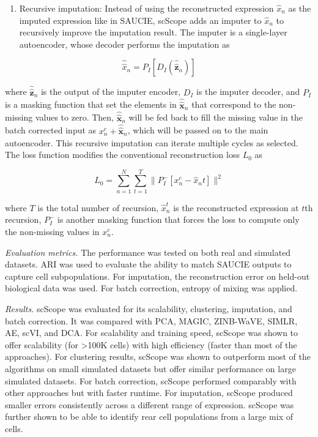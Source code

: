 \documentclass[
]{book}
\providecommand{\tightlist}{%
  \setlength{\itemsep}{0pt}\setlength{\parskip}{0pt}}
\begin{document}
\begin{enumerate}
\def\labelenumi{\arabic{enumi}.}
\setcounter{enumi}{1}
\tightlist
\item
  Recursive imputation: Instead of using the reconstructed expression \(\hat{x}_{n}\) as the imputed expression like in SAUCIE, scScope adds an imputer to \(\hat{x}_{n}\) to recursively improve the imputation result. The imputer is a single-layer autoencoder, whose decoder performs the imputation as
\end{enumerate}

\begin{equation}
\widehat{\widehat{x}}_{n} = P_{I}[D_{I}(\widehat{\widehat{\mathbf{z}}}_{n})] \label{eq:eq41}
\end{equation}

where \(\widehat{\widehat{\mathbf{z}}}_{n}\) is the output of the imputer encoder, \(D_{I}\) is the imputer decoder, and \(P_{I}\) is a masking function that set the elements in \(\widehat{\widehat{\mathbf{x}}}_{n}\) that correspond to the non-missing values to zero. Then, \(\widehat{\widehat{\mathbf{x}}}_{n}\) will be fed back to fill the missing value in the batch corrected input as \(x_{n}^{c}+\widehat{\widehat{\mathbf{x}}}_{n}\), which will be passed on to the main autoencoder. This recursive imputation can iterate multiple cycles as selected.
The loss function modifies the conventional reconstruction loss \(L_{0}\) as

\begin{equation}
L_{0} = \sum_{n=1}^{N}\sum_{t=1}^{T}\|P_{I}^{-}[x_{n}^{c}-\widehat{x}_{n}^{}t]\|^{2} \label{eq:eq42}
\end{equation}

where \(T\) is the total number of recursion, \(\widehat{x}_{n}^{t}\) is the reconstructed expression at \(t\)th recursion, \(P_{I}^{-}\) is another masking function that forces the loss to compute only the non-missing values in \(x_{n}^{c}\).

\emph{Evaluation metrics.} The performance was tested on both real and simulated datasets. ARI was used to evaluate the ability to match SAUCIE outputs to capture cell subpopulations. For imputation, the reconstruction error on held-out biological data was used. For batch correction, entropy of mixing was applied.

\emph{Results.} scScope was evaluated for its scalability, clustering, imputation, and batch correction. It was compared with PCA, MAGIC, ZINB-WaVE, SIMLR, AE, scVI, and DCA. For scalability and training speed, scScope was shown to offer scalability (for \textgreater100K cells) with high efficiency (faster than most of the approaches). For clustering results, scScope was shown to outperform most of the algorithms on small simulated datasets but offer similar performance on large simulated datasets. For batch correction, scScope performed comparably with other approaches but with faster runtime. For imputation, scScope produced smaller errors consistently across a different range of expression. scScope was further shown to be able to identify rear cell populations from a large mix of cells.
\end{document}
